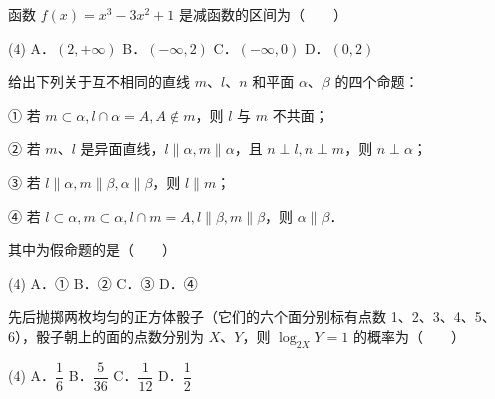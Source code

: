 \begin{question}
函数 $f(x) = x^3 - 3x^2 + 1$ 是减函数的区间为\mbox{（　　）}

\begin{gkopts}(4)
\task A．$(2, +\infty)$
\task B．$(-\infty, 2)$
\task C．$(-\infty, 0)$
\task D．$(0, 2)$
\end{gkopts}

\end{question}
\begin{question}
给出下列关于互不相同的直线 $m$、$l$、$n$ 和平面 $\alpha$、$\beta$ 的四个命题：

① 若 $m \subset \alpha, l \cap \alpha = A, A \notin m$，则 $l$ 与 $m$ 不共面；

② 若 $m$、$l$ 是异面直线，$l \parallel \alpha, m \parallel \alpha$，且 $n \perp l, n \perp m$，则 $n \perp \alpha$；

③ 若 $l \parallel \alpha, m \parallel \beta, \alpha \parallel \beta$，则 $l \parallel m$；

④ 若 $l \subset \alpha, m \subset \alpha, l \cap m = A, l \parallel \beta, m \parallel \beta$，则 $\alpha \parallel \beta$．

其中为假命题的是\mbox{（　　）}

\begin{gkopts}(4)
\task A．①
\task B．②
\task C．③
\task D．④
\end{gkopts}

\end{question}
\begin{question}
先后抛掷两枚均匀的正方体骰子（它们的六个面分别标有点数 1、2、3、4、5、6），骰子朝上的面的点数分别为 $X$、$Y$，则 $\log_{2X} Y = 1$ 的概率为\mbox{（　　）}

\begin{gkopts}(4)
\task A．$\dfrac{1}{6}$
\task B．$\dfrac{5}{36}$
\task C．$\dfrac{1}{12}$
\task D．$\dfrac{1}{2}$
\end{gkopts}

\Needspace{0.4\textheight}
\end{question}

